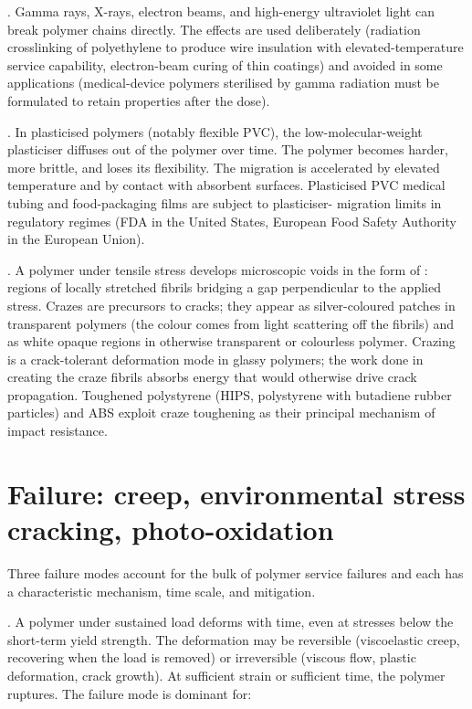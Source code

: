 . Gamma rays, X-rays, electron beams,
and high-energy ultraviolet light can break polymer chains directly.
The effects are used deliberately (radiation crosslinking of
polyethylene to produce wire insulation with elevated-temperature
service capability, electron-beam curing of thin coatings) and avoided
in some applications (medical-device polymers sterilised by gamma
radiation must be formulated to retain properties after the dose).

. In plasticised polymers (notably
flexible PVC), the low-molecular-weight plasticiser diffuses out of
the polymer over time. The polymer becomes harder, more brittle, and
loses its flexibility. The migration is accelerated by elevated
temperature and by contact with absorbent surfaces. Plasticised PVC
medical tubing and food-packaging films are subject to plasticiser-
migration limits in regulatory regimes (FDA in the United States,
European Food Safety Authority in the European Union).

. A polymer under tensile stress
develops microscopic voids in the form of : regions
of locally stretched fibrils bridging a gap perpendicular to the
applied stress. Crazes are precursors to cracks; they appear as
silver-coloured patches in transparent polymers (the colour comes
from light scattering off the fibrils) and as white opaque regions in
otherwise transparent or colourless polymer. Crazing is a
crack-tolerant deformation mode in glassy polymers; the work done in
creating the craze fibrils absorbs energy that would otherwise drive
crack propagation. Toughened polystyrene (HIPS, polystyrene with
butadiene rubber particles) and ABS exploit craze toughening as their
principal mechanism of impact resistance.

\section{Failure: creep, environmental stress cracking, photo-oxidation}

Three failure modes account for the bulk of polymer service failures
and each has a characteristic mechanism, time scale, and mitigation.

. A polymer under sustained load deforms with
time, even at stresses below the short-term yield strength. The
deformation may be reversible (viscoelastic creep, recovering when
the load is removed) or irreversible (viscous flow, plastic
deformation, crack growth). At sufficient strain or sufficient time,
the polymer ruptures. The failure mode is dominant for:

